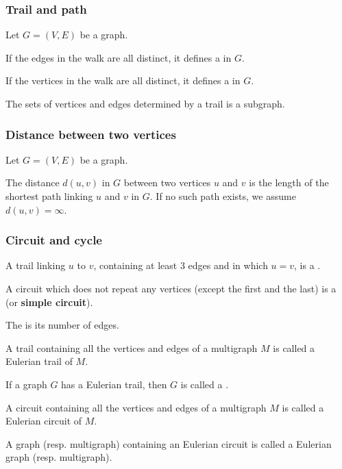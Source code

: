 \documentclass[aspectratio=169]{beamer}
\begin{document}
\begin{frame}\frametitle{Trail and path}
Let $G=(V,E)$ be a graph.
\begin{definition}[{Trail}]
If the edges in the walk are all distinct, it defines a  in $G$.
\end{definition}
\begin{definition}[{Path}]
If the vertices in the walk are all distinct, it defines a  in $G$.
\end{definition}
The sets of vertices and edges determined by a trail is a subgraph.
\end{frame}


\begin{frame}\frametitle{Distance between two vertices}
Let $G=(V,E)$ be a graph.
\begin{definition}
The distance $d(u,v)$ in $G$ between two vertices $u$ and $v$ is the length of the shortest path linking $u$ and $v$ in $G$. If no such path exists, we assume $d(u,v)=\infty$.
\end{definition}
\end{frame}


\begin{frame}\frametitle{Circuit and cycle}
\begin{definition}[{Circuit}]
A trail linking $u$ to $v$, containing at least 3 edges and in which $u=v$, is a .
\end{definition}
\begin{definition}[{Cycle}]
A circuit which does not repeat any vertices (except the first and the last) is a  (or \textbf{simple circuit}).
\end{definition}
\begin{definition}
The  is its number of edges.
\end{definition}
\end{frame}


\begin{frame}
\begin{definition}
	A trail containing all the vertices and edges of a multigraph $M$ is called a Eulerian trail of $M$.
\end{definition}
\begin{definition}
	If a graph $G$ has a Eulerian trail, then $G$ is called a .
\end{definition}
\begin{definition}
	A circuit containing all the vertices and edges of a multigraph $M$ is called a Eulerian circuit of $M$.
\end{definition}
\begin{definition}
	A graph (resp. multigraph) containing an Eulerian circuit is called a Eulerian graph (resp. multigraph).
\end{definition}
\end{frame}
\end{document}
